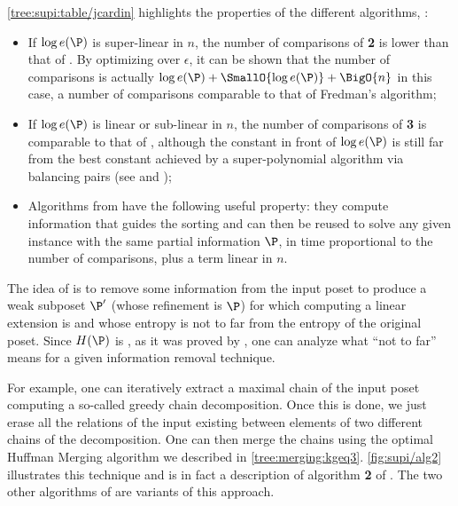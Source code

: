 \ref{tree:supi:table/jcardin} highlights the properties of the different
algorithms, \ie:

\begin{itemize}

\item If $\log e(\P)$ is super-linear in $n$, the number of comparisons of
\citet*{cardinal:2013} \textbf{2} is lower than that of \citet*{kahn:1995}. By
optimizing over $\epsilon$, it can be shown that the number of comparisons is
actually $\log e(\P) + \SmallO{\log e(\P)} + \BigO{n}$ in this case, a number of
comparisons comparable to that of Fredman’s algorithm;

\item If $\log e(\P)$ is linear or sub-linear in $n$, the number of comparisons
of \citet*{cardinal:2013} \textbf{3} is comparable to that of
\citet*{kahn:1995}, although the constant in front of $\log e(\P)$ is still far
from the best constant achieved by a super-polynomial algorithm via balancing
pairs (see \citet*{brightwell1995balancing} and
\citet*{brightwell1999balanced});

\item Algorithms from \citet*{cardinal:2013} have the following useful
property: they compute information that guides the sorting and can then be
reused to solve any given instance with the same partial information $\P$, in
time proportional to the number of comparisons, plus a term linear in $n$.

\end{itemize}

The idea of \citet*{cardinal:2013} is to remove some information from the input
poset to produce a weak subposet \(\P'\) (whose refinement is \(\P\)) for which
computing a linear extension is  and whose entropy is not to
far from the entropy of the original poset. Since \(H(\P)\) is
, as it was proved by \citet*{kahn:1995}, one can analyze what
``not to far'' means for a given information removal technique.

For example, one can iteratively extract a maximal chain of the input poset
computing a so-called greedy chain decomposition. Once this is done, we just
erase all the relations of the input existing between elements of two different
chains of the decomposition. One can then merge the chains using the optimal
Huffman Merging algorithm we described in \ref{tree:merging:kgeq3}.
\ref{fig:supi/alg2} illustrates this technique and is in fact a description of
algorithm \textbf{2} of \citet{cardinal:2013}. The two other algorithms of
\citet*{cardinal:2013} are variants of this approach.

